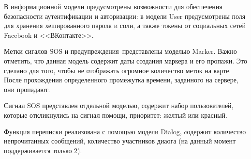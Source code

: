 В информационной модели предусмотрены возможности для обеспечения безопасности аутентификации и авторизации: в модели User предусмотрены поля для хранения хешированного пароля и соли, а также токены от социальных сетей Facebook и <<ВКонтакте>>.

Метки сигалов SOS и предупреждения представлены моделью Marker. Важно отметить, что данная модель содержит даты создания маркера и его пропажи. Это сделано для того, чтобы не отображать огромное количество меток на карте. После прохождения определенного промежутка времени, заданного на сервере, они пропадают.

Сигнал SOS представлен отдельной моделью, содержит набор пользователей, которые откликнулись на сигнал помощи, приоритет: желтый или красный.

Функция переписки реализована с помощью модели Dialog, cодержит количество непрочитанных сообщений, количество участников диаога (на данный момент поддерживается только 2).















